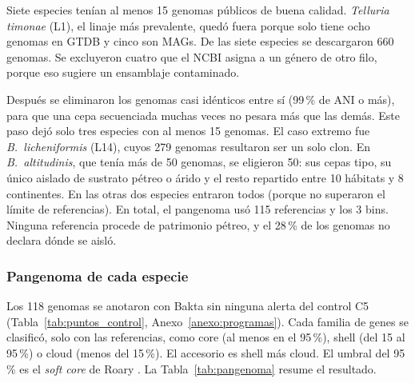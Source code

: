 Siete especies tenían al menos 15 genomas públicos de buena calidad.
\textit{Telluria timonae} (L1), el linaje más prevalente, quedó fuera porque
solo tiene ocho genomas en GTDB y cinco son MAGs. De las siete especies se
descargaron 660 genomas. Se excluyeron cuatro que el NCBI asigna a un género de
otro filo, porque eso sugiere un ensamblaje contaminado.

Después se eliminaron los genomas casi idénticos entre sí (99\,\% de ANI o más),
para que una cepa secuenciada muchas veces no pesara más que las demás. Este
paso dejó solo tres especies con al menos 15 genomas. El caso extremo fue
\textit{B.~licheniformis} (L14), cuyos 279 genomas resultaron ser un solo clon.
En \textit{B.~altitudinis}, que tenía más de 50 genomas, se eligieron 50: sus
cepas tipo, su único aislado de sustrato pétreo o árido y el resto repartido
entre 10 hábitats y 8 continentes. En las otras dos especies entraron todos (porque no superaron el límite de referencias).
En total, el pangenoma usó 115 referencias y los 3 bins. Ninguna referencia
procede de patrimonio pétreo, y el 28\,\% de los genomas no declara dónde se
aisló.

\subsubsection{Pangenoma de cada especie}
\label{subsubsec:res_pangenoma}

Los 118 genomas se anotaron con Bakta sin ninguna alerta del control C5
(Tabla~\ref{tab:puntos_control}, Anexo~\ref{anexo:programas}). Cada familia de
genes se clasificó, solo con las referencias, como core (al menos en el
95\,\%), shell (del 15 al 95\,\%) o cloud (menos del 15\,\%). El accesorio es
shell más cloud. El umbral del 95\,\% es el \textit{soft core} de Roary
\cite{Page2015}. La Tabla~\ref{tab:pangenoma} resume el resultado.

\begin{table}[htbp]
\centering
\footnotesize
\setlength{\tabcolsep}{4pt}
\caption[Tamaño y partición del pangenoma]{Tamaño y partición del pangenoma de
cada especie, calculados solo con las referencias. Singletons: familias de una
sola referencia. $\alpha$: exponente de la ley de Heaps, con su rango al quitar
un genoma cada vez.}
\label{tab:pangenoma}
\end{table}

